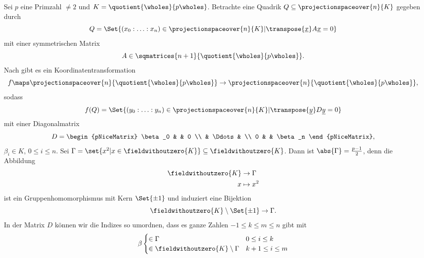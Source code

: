 \begin{beispiel*}
  Sei \( p \) eine Primzahl \( \neq 2 \) und \( K=\quotient{\wholes}{p\wholes} \). Betrachte eine Quadrik \( Q\subseteq \projectionspaceover{n}{K} \) gegeben durch
  \begin{equation*}
    Q=\Set{(x_0:\dotsc:x_n)\in \projectionspaceover{n}{K}|\transpose{\underline{x}}A\underline{x}=0}
  \end{equation*}
  mit einer symmetrischen Matrix
  \begin{equation*}
    A\in \sqmatrices{n+1}{\quotient{\wholes}{p\wholes}}.
  \end{equation*}
  Nach  gibt es ein Koordinatentransformation
  \begin{equation}
    f\maps \projectionspaceover{n}{\quotient{\wholes}{p\wholes}}\to\projectionspaceover{n}{\quotient{\wholes}{p\wholes}},
  \end{equation}
  sodass
  \begin{equation*}
    f(Q)=\Set{(y_0:\dotsc:y_n)\in \projectionspaceover{n}{K}|\transpose{\underline{y}}D\underline{y}=0}
  \end{equation*}
  mit einer Diagonalmatrix
  \begin{equation*}
    D=\begin{pNiceMatrix} \beta_0 &  & 0 \\  & \Ddots &  \\ 0 &  & \beta_n \end{pNiceMatrix},
  \end{equation*}
  \( \beta_i\in K \), \( 0\leq i\leq n \). Sei \( \Gamma=\set{x^2|x\in \fieldwithoutzero{K}}\subseteq \fieldwithoutzero{K} \). Dann ist \( \abs{\Gamma}=\frac{p-1}{2} \), denn die Abbildung
  \begin{align*}
    \fieldwithoutzero{K}&\to \Gamma\\
    x&\mapsto x^2
  \end{align*}
  ist ein Gruppenhomomorphismus mit Kern \( \Set{\pm 1} \) und induziert eine Bijektion
  \begin{equation*}
    \fieldwithoutzero{K}\setminus\Set{\pm 1}\to \Gamma.
  \end{equation*}
  In der Matrix \( D \) können wir die Indizes so umordnen, dass es ganze Zahlen \( -1\leq k\leq m\leq n \) gibt mit
  \begin{equation*}
    \beta \begin{cases}
      \in \Gamma &0\leq i\leq k\\
      \in \fieldwithoutzero{K}\setminus \Gamma & k+1\leq i\leq m\\

\end{cases}
\end{equation*}
\end{beispiel*}

